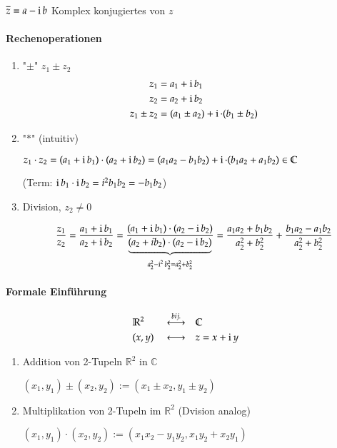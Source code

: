 \begin{definition}
 $\overline{z} = a - \operatorname{i} b$ Komplex konjugiertes von $z$
\end{definition}

\paragraph{Rechenoperationen}
\begin{enumerate}

\item "$\pm$" $z_1 \pm z_2$
\begin{align*}
z_1 & = a_1 + \operatorname{i} b_1 \\ 
z_2 & = a_2 + \operatorname{i} b_2 \\
z_1 \pm z_2 & = (a_1 \pm a_2) + \operatorname{i} \cdot (b_1 \pm b_2)
\end{align*}

\item "$\ast$" (intuitiv)

$z_1 \cdot z_2 = (a_1 + \operatorname{i} b_1) \cdot (a_2 + \operatorname{i} b_2) = (a_1 a_2 - b_1 b_2) + \operatorname{i} \cdot (b_1 a_2 + a_1 b_2) \in \mathbb{C}$

(Term: $\operatorname{i} b_1 \cdot \operatorname{i} b_2 = i^2 b_1 b_2 = - b_1 b_2$)

\item Division, $z_2 \neq 0$

$$ \frac{z_1}{z_2} = \frac{a_1 + \operatorname{i} b_1}{a_2 + \operatorname{i} b_2} = \frac{(a_1 + \operatorname{i} b_1) \cdot (a_2 - \operatorname{i} b_2)}{\underbrace{(a_2 + i b_2) \cdot (a_2 - \operatorname{i} b_2)}_{a_2^2 - \operatorname{i}^2 b_2^2 = a_2^2 + b_2^2}} = \frac{a_1 a_2 + b_1 b_2}{a_2^2 + b_2^2} + \frac{b_1 a_2 - a_1 b_2}{a_2^2 + b_2^2}$$

\end{enumerate}

\paragraph{Formale Einführung}
\begin{alignat*}{3}
& \mathbb{R}^2 && \overset{bij.}{\longleftrightarrow} && \mathbb{C} \\
& (x, y) && \longleftrightarrow && z = x + \operatorname{i} y
\end{alignat*}
\begin{enumerate}
\item Addition von 2-Tupeln $\mathbb{R}^2$ in $\mathbb{C}$

$(x_1, y_1) \pm (x_2, y_2) := (x_1 \pm x_2, y_1 \pm y_2)$

\item Multiplikation von 2-Tupeln im $\mathbb{R}^2$ (Dvision analog)

$ (x_1, y_1) \cdot (x_2, y_2) := (x_1 x_2 - y_1 y_2, x_1 y_2 + x_2 y_1)$
\end{enumerate}

